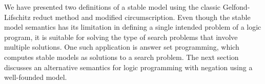 We have presented two definitions of a stable model using the classic 
Gelfond-\\Lifschitz reduct method 
and modified circumscription. Even though the stable model semantics has its limitation in 
defining a single intended problem of a logic program, it is suitable for solving 
the type of search problems that involve multiple solutions. One such application is answer 
set programming, which computes stable models as solutions to a search problem. The next 
section discusses an alternative semantics for logic programming with negation using 
a well-founded model.